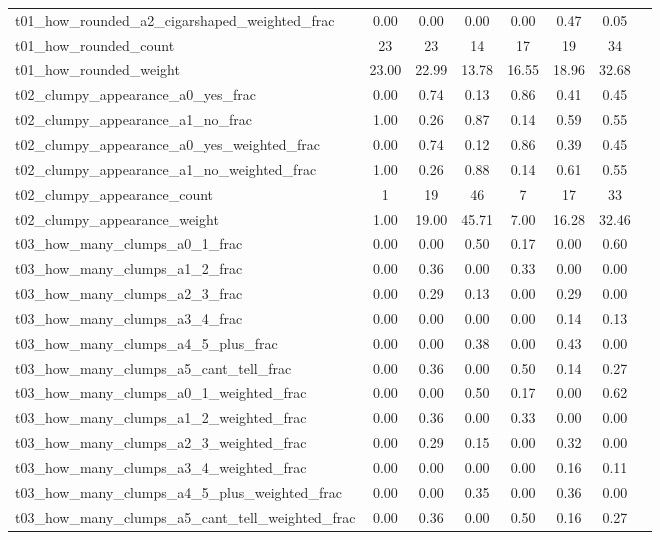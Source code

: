 \begin{table*}
{\begin{tabular}{@{}lccccccc}
t01\_how\_rounded\_a2\_cigarshaped\_weighted\_frac & 0.00 & 0.00 & 0.00 & 0.00 & 0.47 & 0.05 &\\
t01\_how\_rounded\_count & 23 & 23 & 14 & 17 & 19 & 34 &\\
t01\_how\_rounded\_weight & 23.00 & 22.99 & 13.78 & 16.55 & 18.96 & 32.68 &\\
t02\_clumpy\_appearance\_a0\_yes\_frac & 0.00 & 0.74 & 0.13 & 0.86 & 0.41 & 0.45 &\\
t02\_clumpy\_appearance\_a1\_no\_frac & 1.00 & 0.26 & 0.87 & 0.14 & 0.59 & 0.55 &\\
t02\_clumpy\_appearance\_a0\_yes\_weighted\_frac & 0.00 & 0.74 & 0.12 & 0.86 & 0.39 & 0.45 &\\
t02\_clumpy\_appearance\_a1\_no\_weighted\_frac & 1.00 & 0.26 & 0.88 & 0.14 & 0.61 & 0.55 &\\
t02\_clumpy\_appearance\_count & 1 & 19 & 46 & 7 & 17 & 33 &\\
t02\_clumpy\_appearance\_weight & 1.00 & 19.00 & 45.71 & 7.00 & 16.28 & 32.46 &\\
t03\_how\_many\_clumps\_a0\_1\_frac & 0.00 & 0.00 & 0.50 & 0.17 & 0.00 & 0.60 &\\
t03\_how\_many\_clumps\_a1\_2\_frac & 0.00 & 0.36 & 0.00 & 0.33 & 0.00 & 0.00 &\\
t03\_how\_many\_clumps\_a2\_3\_frac & 0.00 & 0.29 & 0.13 & 0.00 & 0.29 & 0.00 &\\
t03\_how\_many\_clumps\_a3\_4\_frac & 0.00 & 0.00 & 0.00 & 0.00 & 0.14 & 0.13 &\\
t03\_how\_many\_clumps\_a4\_5\_plus\_frac & 0.00 & 0.00 & 0.38 & 0.00 & 0.43 & 0.00 &\\
t03\_how\_many\_clumps\_a5\_cant\_tell\_frac & 0.00 & 0.36 & 0.00 & 0.50 & 0.14 & 0.27 &\\
t03\_how\_many\_clumps\_a0\_1\_weighted\_frac & 0.00 & 0.00 & 0.50 & 0.17 & 0.00 & 0.62 &\\
t03\_how\_many\_clumps\_a1\_2\_weighted\_frac & 0.00 & 0.36 & 0.00 & 0.33 & 0.00 & 0.00 &\\
t03\_how\_many\_clumps\_a2\_3\_weighted\_frac & 0.00 & 0.29 & 0.15 & 0.00 & 0.32 & 0.00 &\\
t03\_how\_many\_clumps\_a3\_4\_weighted\_frac & 0.00 & 0.00 & 0.00 & 0.00 & 0.16 & 0.11 &\\
t03\_how\_many\_clumps\_a4\_5\_plus\_weighted\_frac & 0.00 & 0.00 & 0.35 & 0.00 & 0.36 & 0.00 &\\
t03\_how\_many\_clumps\_a5\_cant\_tell\_weighted\_frac & 0.00 & 0.36 & 0.00 & 0.50 & 0.16 & 0.27 &\\

\end{tabular}}
\end{table*}
